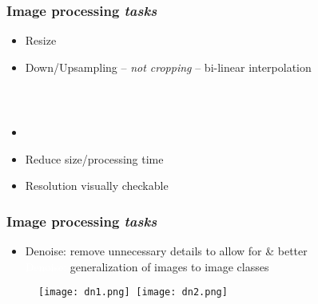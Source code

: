 \documentclass[xcolor={dvipsnames}]{beamer}
\begin{document}
\frame
{
 \frametitle{Image processing \emph{tasks}}
 
\begin{itemize}
\item Resize 
\item[]<3-> Down/Upsampling -- \emph{not cropping} -- bi-linear interpolation
\vspace{-1.25em}
\begin{columns}
\begin{column}{.4\textwidth}
\begin{figure}
\centering
{}\\

\end{figure}

\end{column}
\begin{column}{.5\textwidth}
\begin{figure}
\centering
{}
\end{figure}
\end{column}
\end{columns}

\item[]
\item[]<4-> Reduce size/processing time
\item[]<5-> Resolution visually checkable
 \end{itemize}
}



\frame
{
 \frametitle{Image processing \emph{tasks}}
 
\begin{itemize}
\item Denoise: remove unnecessary details to allow for \& better\\
 \textcolor{white}{Denoise:} generalization of images to image classes\\
\end{itemize}

\begin{figure}
\centering
{\texttt{[image: dn1.png]}}$\;\;${\texttt{[image: dn2.png]}}
\end{figure}

}
\end{document}
